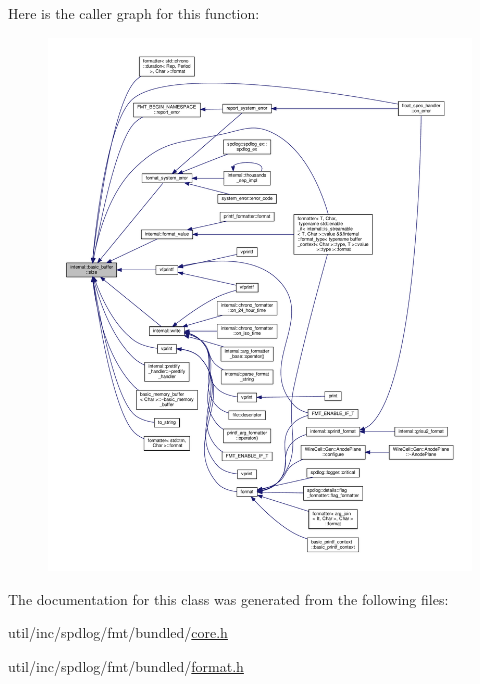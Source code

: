 Here is the caller graph for this function\+:
\nopagebreak
\begin{figure}[H]
\begin{center}
\leavevmode
\includegraphics[width=350pt]{classinternal_1_1basic__buffer_abc95713c3873c5820f10105fe7c7af93_icgraph}
\end{center}
\end{figure}


The documentation for this class was generated from the following files\+:\begin{DoxyCompactItemize}
\item 
util/inc/spdlog/fmt/bundled/\hyperlink{core_8h}{core.\+h}\item 
util/inc/spdlog/fmt/bundled/\hyperlink{format_8h}{format.\+h}\end{DoxyCompactItemize}
